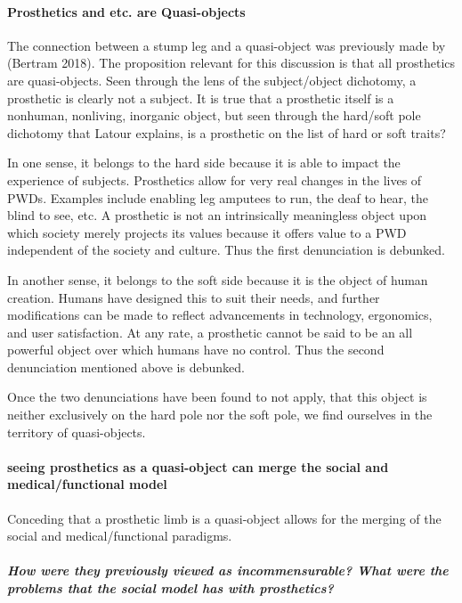 \documentclass[a4paper]{article}
\begin{document}
\paragraph{Prosthetics and etc. are Quasi-objects}

The connection between a stump leg and a quasi-object was previously made by
(Bertram 2018). The proposition relevant for this discussion is that all
prosthetics are quasi-objects. Seen through the lens of the subject/object
dichotomy, a prosthetic is clearly not a subject. It is true that a prosthetic
itself is a nonhuman, nonliving, inorganic object, but seen through the
hard/soft pole dichotomy that Latour explains, is a prosthetic on the list of
hard or soft traits? 

In one sense, it belongs to the hard side because it is able to impact the
experience of subjects. Prosthetics allow for very real changes in the lives
of PWDs. Examples include enabling leg amputees to run, the deaf to hear, the
blind to see, etc. A prosthetic is not an intrinsically meaningless object
upon which society merely projects its values because it offers value to a PWD
independent of the society and culture. Thus the first denunciation is
debunked.

In another sense, it belongs to the soft side because it is the object of
human creation. Humans have designed this to suit their needs, and further
modifications can be made to reflect advancements in technology, ergonomics,
and user satisfaction. At any rate, a prosthetic cannot be said to be an all
powerful object over which humans have no control. Thus the second
denunciation mentioned above is debunked.

Once the two denunciations have been found to not apply, that this object is
neither exclusively on the hard pole nor the soft pole,  we find ourselves in
the territory of quasi-objects.


\paragraph{seeing prosthetics as a quasi-object can merge the social and
medical/functional model}

Conceding that a prosthetic limb is a quasi-object allows for the merging of
the social and medical/functional paradigms. 

\subparagraph{How were they previously viewed as incommensurable? What were
the problems that the social model has with prosthetics?}
\end{document}
